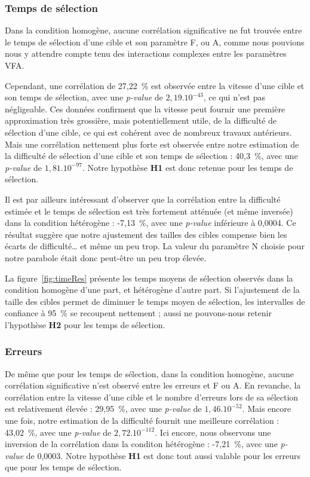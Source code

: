 	\subsubsection{Temps de sélection}
	Dans la condition homogène, aucune corrélation significative ne fut trouvée entre le temps de sélection d'une cible et son paramètre F, ou A, comme nous pouvions nous y attendre compte tenu des interactions complexes entre les paramètres VFA.
	
	Cependant, une corrélation de 27,22~\%{} est observée entre la vitesse d'une cible et son temps de sélection, avec une \emph{p-value} de $2,19.10^{-43}$, ce qui n'est pas négligeable. Ces données confirment que la vitesse peut fournir une première approximation très grossière, mais potentiellement utile, de la difficulté de sélection d'une cible, ce qui est cohérent avec de nombreux travaux antérieurs. Mais une corrélation nettement plus forte est observée entre notre estimation de la difficulté de sélection d'une cible et son temps de sélection : 40,3~\%{}, avec une \emph{p-value} de $1,81.10^{-97}$. Notre hypothèse \textbf{H1} est donc retenue pour les temps de sélection.
	
	Il est par ailleurs intéressant d'observer que la corrélation entre la difficulté estimée et le temps de sélection est très fortement atténuée (et même inversée) dans la condition hétérogène : -7,13~\%{}, avec une \emph{p-value} inférieure à 0,0004. Ce résultat suggère que notre ajustement des tailles des cibles compense bien les écarts de difficulté\ldots{} et même un peu trop. La valeur du paramètre N choisie pour notre parabole était donc peut-être un peu trop élevée.
	
	La figure~\ref{fig:timeRes} présente les temps moyens de sélection observés dans la condition homogène d'une part, et hétérogène d'autre part. Si l'ajustement de la taille des cibles permet de diminuer le temps moyen de sélection, les intervalles de confiance à 95~\%{} se recoupent nettement ; aussi ne pouvons-nous retenir l'hypothèse \textbf{H2} pour les temps de sélection.
	
	\subsubsection{Erreurs}
	De même que pour les temps de sélection, dans la condition homogène, aucune corrélation significative n'est observé entre les erreurs et F ou A. En revanche, la corrélation entre la vitesse d'une cible et le nombre d'erreurs lors de sa sélection est relativement élevée : 29,95~\%{}, avec une \emph{p-value} de $1,46.10^{-52}$. Mais encore une fois, notre estimation de la difficulté fournit une meilleure corrélation : 43,02~\%{}, avec une \emph{p-value} de $2,72.10^{-112}$. Ici encore, nous observons une inversion de la corrélation dans la conditon hétérogène : -7,21~\%{}, avec une \emph{p-value} de 0,0003. Notre hypothèse \textbf{H1} est donc tout aussi valable pour les erreurs que pour les temps de sélection.
	
